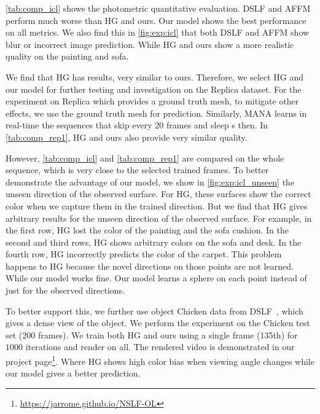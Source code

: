\cref{tab:comp_icl} shows the photometric quantitative evaluation. 
DSLF and AFFM perform much worse than HG and ours. 
Our model shows the best performance on all metrics.
We also find this in \cref{fig:exp:icl} that
both DSLF and AFFM show blur or incorrect image prediction. While
HG and ours show a more realistic quality on the painting and sofa.%

We find that HG has results, very similar to ours.
Therefore, we select HG and our model for further testing and investigation on the Replica dataset.
For the experiment on Replica which provides a ground truth mesh, to mitigate other effects, we use the ground truth mesh for prediction.
Similarly, MANA learns in real-time the sequences that skip every 20 frames and sleep \unit[1]{s} then.
In \cref{tab:comp_rep1}, HG and ours also provide very similar quality.

However, \cref{tab:comp_icl} and \cref{tab:comp_rep1} are compared on the whole sequence, which is very close to the selected trained frames.
To better demonstrate the advantage of our model, we show in \cref{fig:exp:icl_unseen} the unseen direction of the observed surface. 
For HG, these surfaces show the correct color when we capture them in the trained direction.
But we find that HG gives arbitrary results for the unseen direction of the observed surface.
For example, in the first row, HG lost the color of the painting and the sofa cushion.
In the second and third rows, HG shows arbitrary colors on the sofa and desk.
In the fourth row, HG incorrectly predicts the color of the carpet.
%
This problem happens to HG because the novel directions on those points are not learned.
%
While our model works fine.
Our model learns a sphere on each point instead of just for the observed directions.

To better support this, we further use object Chicken data from DSLF~\cite{chen2018deep}, which gives a dense view of the object.
We perform the experiment on the Chicken test set (200 frames). 
We train both HG and ours using a single frame (135th) for $1000$ iterations and render on all. 
The rendered video is demonstrated in our project page\footnote{\url{https://jarrome.github.io/NSLF-OL}}. Where HG shows high color bias when viewing angle changes while our model gives a better prediction.

